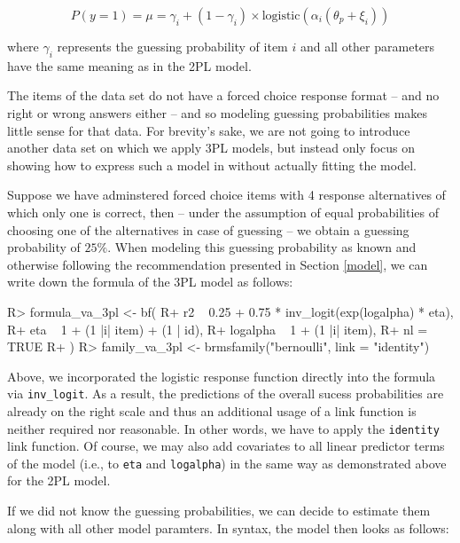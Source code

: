 \documentclass[jss]{jss}
\begin{document}
\[
P(y = 1) = \mu = \gamma_i + (1 - \gamma_i) \times \text{logistic}(\alpha_i (\theta_p + \xi_i))
\]

where \(\gamma_i\) represents the guessing probability of item \(i\) and
all other parameters have the same meaning as in the 2PL model.

The items of the  data set do not have a forced choice
response format -- and no right or wrong answers either -- and so
modeling guessing probabilities makes little sense for that data. For
brevity's sake, we are not going to introduce another data set on which
we apply 3PL models, but instead only focus on showing how to express
such a model in  without actually fitting the model.

Suppose we have adminstered forced choice items with 4 response
alternatives of which only one is correct, then -- under the assumption
of equal probabilities of choosing one of the alternatives in case of
guessing -- we obtain a guessing probability of \(25\%\). When modeling
this guessing probability as known and otherwise following the
recommendation presented in Section \ref{model}, we can write down the
formula of the 3PL model as follows:

\begin{CodeChunk}

\begin{CodeInput}
R> formula_va_3pl <- bf(
R+   r2 ~ 0.25 + 0.75 * inv_logit(exp(logalpha) * eta),
R+   eta ~ 1 + (1 |i| item) + (1 | id),
R+   logalpha ~ 1 + (1 |i| item),
R+   nl = TRUE
R+ )
R> family_va_3pl <- brmsfamily("bernoulli", link = "identity")
\end{CodeInput}
\end{CodeChunk}

Above, we incorporated the logistic response function directly into the
formula via \texttt{inv\_logit}. As a result, the predictions of the
overall sucess probabilities are already on the right scale and thus an
additional usage of a link function is neither required nor reasonable.
In other words, we have to apply the \texttt{identity} link function. Of
course, we may also add covariates to all linear predictor terms of the
model (i.e., to \texttt{eta} and \texttt{logalpha}) in the same way as
demonstrated above for the 2PL model.

If we did not know the guessing probabilities, we can decide to estimate
them along with all other model paramters. In  syntax, the
model then looks as follows:
\end{document}
